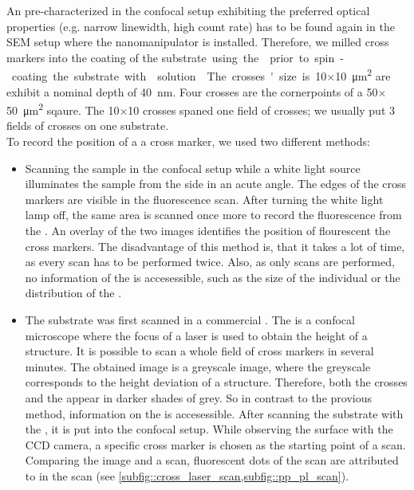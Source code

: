 	An \nd pre-characterized in the confocal setup exhibiting the preferred optical properties (e.g. narrow linewidth, high count rate) has to be found again in the SEM setup where the nanomanipulator is installed.
	Therefore, we milled cross markers into the \ir coating of the \si substrate using the \fib prior to spin-coating the substrate with \nd solution.
	The crosses' size is \num{10}$\times$\SI{10}{\micro\meter\squared} are exhibit a nominal depth of \SI{40}{nm}.
	Four crosses are the cornerpoints of a \num{50}$\times$\SI{50}{\micro\meter\squared} sqaure.
	The \num{10}$\times$\num{10} crosses spaned one field of crosses; we usually put 3 fields of crosses on one substrate.
	\\
	To record the position of a \nd \wrt a cross marker, we used two different methods:
	\begin{itemize}
		\item Scanning the sample in the confocal setup while a white light source illuminates the sample from the side in an acute angle. The edges of the cross markers are visible in the fluorescence scan. After turning the white light lamp off, the same area is scanned once more to record the fluorescence from the \sivs. An overlay of the two images identifies the position of flourescent \sivs \wrt the cross markers. The disadvantage of this method is, that it takes a lot of time, as every scan has to be performed twice. Also, as only \fl scans are performed, no information of the \nds is accesessible, such as the size of the individual \nds or the distribution of the \nds. 
		\item The substrate was first scanned in a commercial \lsm {}. The \lsm is a confocal microscope where the focus of a laser is used to obtain the height of a structure. It is possible to scan a whole field of cross markers in several minutes. The obtained image is a greyscale image, where the greyscale corresponds to the height deviation of a structure. Therefore, both the crosses and the \nds appear in darker shades of grey. So in contrast to the provious method, information on the \nds is accesessible. After scanning the substrate with the \lsm, it is put into the confocal setup. While observing the surface with the CCD camera, a specific cross marker is chosen as the starting point of a \fl scan. Comparing the \lsm image and a \fl scan, fluorescent dots of the \fl scan are attributed to \nds in the \lsm scan (see \cref{subfig::cross_laser_scan,subfig::pp_pl_scan}).
	\end{itemize}


